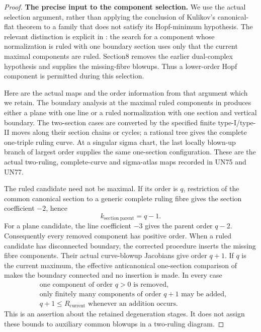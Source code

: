 \begin{proof}
\par\medskip\noindent\textbf{The precise input to the component selection.}
We use the actual selection argument, rather than
applying the conclusion of Kulikov's canonical-flat
theorem to a family that does not satisfy its
Hopf-minimum hypothesis. The relevant distinction
is explicit in \cite[\S7]{Kulikov1981}: the search
for a component whose normalization is ruled with
one boundary section uses only that the current
maximal components are ruled. Section8 removes
the earlier dual-complex hypothesis and supplies
the missing-fibre blowups. Thus a lower-order Hopf
component is permitted during this selection.

Here are the actual maps and the order information
from that argument which we retain. The boundary
analysis at the maximal ruled components in
\cite[\S\S4.8.5--4.8.12,4.16.2--4.16.6]{Kulikov1977}
produces either a plane with one line or a ruled
normalization with one section and vertical boundary.
The two-section cases are converted by the specified
finite type-I/type-II moves along their section
chains or cycles; a rational tree gives the complete
one-triple ruling curve. At a singular sigma chart,
the last locally blown-up branch of largest order
supplies the same one-section configuration. These
are the actual two-ruling, complete-curve and
sigma-atlas maps recorded in UN75 and UN77.

The ruled candidate need not be maximal. If its
order is \(q\), restriction of the common canonical
section to a generic complete ruling fibre gives
the section coefficient \(-2\), hence
\[
       k_{\mathrm{section\ parent}}=q-1.
 \tag{C.TK.3}
\]
For a plane candidate, the line coefficient \(-3\)
gives the parent order \(q-2\). Consequently every
removed component has positive order. When a ruled
candidate has disconnected boundary, the corrected
procedure inserts the missing fibre components.
Their actual curve-blowup Jacobians give order
\(q+1\). If \(q\) is the current maximum, the
effective anticanonical one-section comparison
of \cite[Lemma2.19]{Kulikov1977} makes the boundary
connected and no insertion is made. In every case
\[
 \begin{split}
 &\text{one component of order }q>0\text{ is removed},\\
 &\text{only finitely many components of order }q+1
       \text{ may be added},\\
 &q+1\le R_{\mathrm{current}}\text{ whenever an addition occurs}.
 \end{split}
 \tag{C.TK.4}
\]
This is an assertion about the retained degeneration
stages. It does not assign these bounds to auxiliary
common blowups in a two-ruling diagram.


\end{proof}
